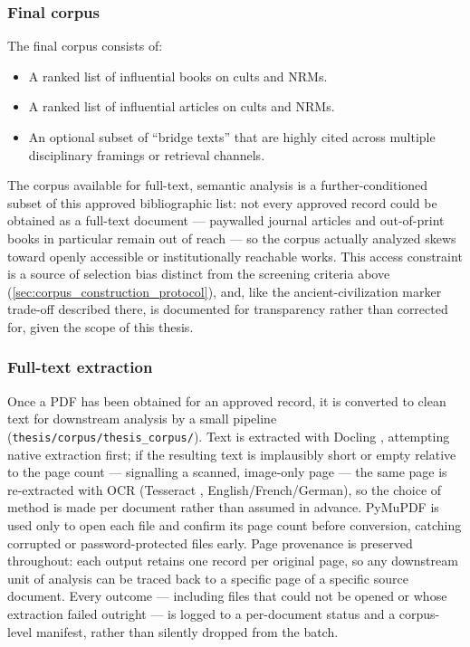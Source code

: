 \subsubsection{Final corpus}
The final corpus consists of:
\begin{itemize}
	\item A ranked list of influential books on cults and NRMs.
	\item A ranked list of influential articles on cults and NRMs.
	\item An optional subset of \enquote{bridge texts} that are highly cited across multiple disciplinary framings or retrieval channels.
\end{itemize}

The corpus available for full-text, semantic analysis is a further-conditioned subset of this approved bibliographic list: not every approved record could be obtained as a full-text document — paywalled journal articles and out-of-print books in particular remain out of reach — so the corpus actually analyzed skews toward openly accessible or institutionally reachable works. This access constraint is a source of selection bias distinct from the screening criteria above (\ref{sec:corpus_construction_protocol}), and, like the ancient-civilization marker trade-off described there, is documented for transparency rather than corrected for, given the scope of this thesis.

\subsubsection{Full-text extraction}\label{sec:pdf_extraction}
Once a PDF has been obtained for an approved record, it is converted to clean text for downstream analysis by a small pipeline (\texttt{thesis/corpus/thesis\_corpus/}). Text is extracted with Docling \autocite{auerDoclingTechnicalReport2024}, attempting native extraction first; if the resulting text is implausibly short or empty relative to the page count — signalling a scanned, image-only page — the same page is re-extracted with OCR (Tesseract \autocite{smithOverviewTesseractOCR2007}, English/French/German), so the choice of method is made per document rather than assumed in advance. PyMuPDF is used only to open each file and confirm its page count before conversion, catching corrupted or password-protected files early. Page provenance is preserved throughout: each output retains one record per original page, so any downstream unit of analysis can be traced back to a specific page of a specific source document. Every outcome — including files that could not be opened or whose extraction failed outright — is logged to a per-document status and a corpus-level manifest, rather than silently dropped from the batch.

